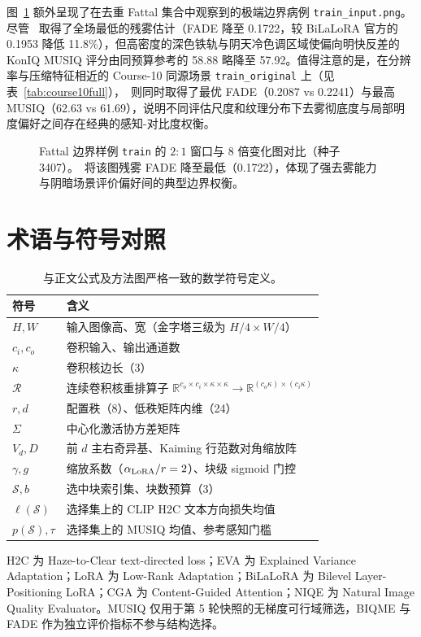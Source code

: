 \documentclass[10pt,twocolumn,letterpaper]{article}
\begin{document}
图~\ref{fig:traincase} 额外呈现了在去重 Fattal 集合中观察到的极端边界病例 \texttt{train\_input.png}。尽管 \method~取得了全场最低的残雾估计（FADE 降至 0.1722，较 BiLaLoRA 官方的 0.1953 降低 11.8\%），但高密度的深色铁轨与阴天冷色调区域使偏向明快反差的 KonIQ MUSIQ 评分由同预算参考的 58.88 略降至 57.92。值得注意的是，在分辨率与压缩特征相近的 Course-10 同源场景 \texttt{train\_original} 上（见表~\ref{tab:course10full}），\method~则同时取得了最优 FADE（0.2087 vs 0.2241）与最高 MUSIQ（62.63 vs 61.69），说明不同评估尺度和纹理分布下去雾彻底度与局部明度偏好之间存在经典的感知-对比度权衡。

\begin{figure}[H]\centering
\caption{Fattal 边界样例 \texttt{train} 的 $2:1$ 窗口与 8 倍变化图对比（种子 3407）。\method~将该图残雾 FADE 降至最低（0.1722），体现了强去雾能力与阴暗场景评价偏好间的典型边界权衡。}
\label{fig:traincase}
\end{figure}

\section{术语与符号对照}
\begin{table}[H]\centering\small
\begin{tabular*}{\columnwidth}{@{\extracolsep{\fill}}ll@{}}\toprule
符号 & 含义\\\midrule
$H,W$ & 输入图像高、宽（金字塔三级为 $H/4\times W/4$）\\
$c_i,c_o$ & 卷积输入、输出通道数\\
$\kappa$ & 卷积核边长（3）\\
$\mathcal R$ & 连续卷积核重排算子 $\mathbb R^{c_o\times c_i\times\kappa\times\kappa}\to\mathbb R^{(c_o\kappa)\times(c_i\kappa)}$\\
$r,d$ & 配置秩（8）、低秩矩阵内维（24）\\
$\Sigma$ & 中心化激活协方差矩阵\\
$V_d,D$ & 前 $d$ 主右奇异基、Kaiming 行范数对角缩放阵\\
$\gamma,g$ & 缩放系数（$\alpha_{\rm LoRA}/r=2$）、块级 sigmoid 门控\\
$\mathcal S,b$ & 选中块索引集、块数预算（3）\\
$\ell(\mathcal S)$ & 选择集上的 CLIP H2C 文本方向损失均值\\
$p(\mathcal S),\tau$ & 选择集上的 MUSIQ 均值、参考感知门槛\\\bottomrule
\end{tabular*}
\caption{与正文公式及方法图严格一致的数学符号定义。}
\end{table}
H2C 为 Haze-to-Clear text-directed loss；EVA 为 Explained Variance Adaptation；LoRA 为 Low-Rank Adaptation；BiLaLoRA 为 Bilevel Layer-Positioning LoRA；CGA 为 Content-Guided Attention；NIQE 为 Natural Image Quality Evaluator。MUSIQ 仅用于第 5 轮快照的无梯度可行域筛选，BIQME 与 FADE 作为独立评价指标不参与结构选择。

\FloatBarrier
\clearpage\twocolumn
{\small{}}
\end{document}
